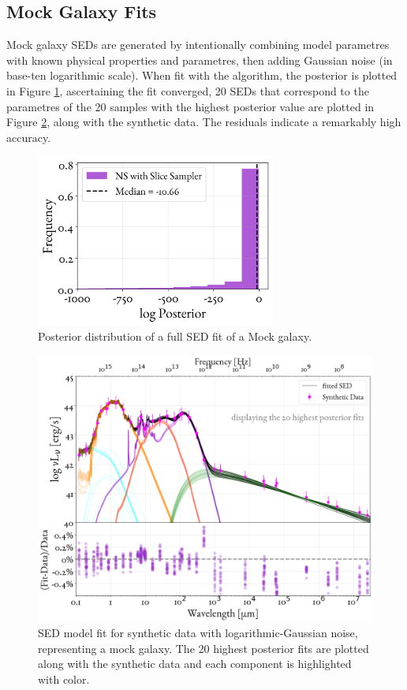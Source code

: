 \subsection*{Mock Galaxy Fits}
Mock galaxy SEDs are generated by intentionally combining model parametres with known physical properties and parametres, then adding Gaussian noise (in base-ten logarithmic scale). When fit with the algorithm, the posterior is plotted in Figure \ref{fig:MockSEDPost}, ascertaining the fit converged, 20 SEDs that correspond to the parametres of the 20 samples with the highest posterior value are plotted in Figure \ref{fig:MockSEDfit}, along with the synthetic data. The residuals indicate a remarkably high accuracy. 
\begin{figure}
\centering
  \includegraphics[width = 0.7\textwidth]{figures/MockFit/Mockfit_Posterior_1stel.png}
  \caption{Posterior distribution of a full SED fit of a Mock galaxy.}
  \label{fig:MockSEDPost}
\end{figure}

\begin{figure}
  \includegraphics[width = \textwidth]{figures/MockFit/MockSEDfit_wRad_1stel_wPerCent_doubleaxes.png}
  \caption{SED model fit for synthetic data with logarithmic-Gaussian noise, representing a mock galaxy. The 20 highest posterior fits are plotted along with the synthetic data and each component is highlighted with color. }
  \label{fig:MockSEDfit}
\end{figure}

